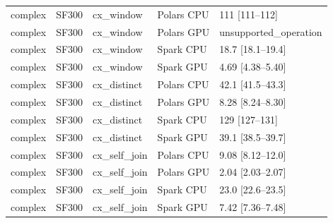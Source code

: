 \begin{longtable}{lllll}
complex & SF300 & cx\_window & Polars CPU & 111 [111--112] \\
complex & SF300 & cx\_window & Polars GPU & unsupported\_operation \\
complex & SF300 & cx\_window & Spark CPU & 18.7 [18.1--19.4] \\
complex & SF300 & cx\_window & Spark GPU & 4.69 [4.38--5.40] \\
complex & SF300 & cx\_distinct & Polars CPU & 42.1 [41.5--43.3] \\
complex & SF300 & cx\_distinct & Polars GPU & 8.28 [8.24--8.30] \\
complex & SF300 & cx\_distinct & Spark CPU & 129 [127--131] \\
complex & SF300 & cx\_distinct & Spark GPU & 39.1 [38.5--39.7] \\
complex & SF300 & cx\_self\_join & Polars CPU & 9.08 [8.12--12.0] \\
complex & SF300 & cx\_self\_join & Polars GPU & 2.04 [2.03--2.07] \\
complex & SF300 & cx\_self\_join & Spark CPU & 23.0 [22.6--23.5] \\
complex & SF300 & cx\_self\_join & Spark GPU & 7.42 [7.36--7.48] \\
\end{longtable}
